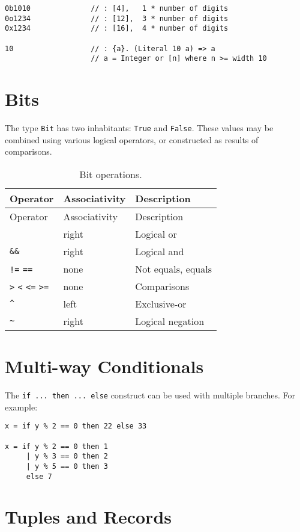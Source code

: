 \begin{verbatim}
0b1010              // : [4],   1 * number of digits
0o1234              // : [12],  3 * number of digits
0x1234              // : [16],  4 * number of digits

10                  // : {a}. (Literal 10 a) => a
                    // a = Integer or [n] where n >= width 10
\end{verbatim}

\section{Bits}\label{bits}

The type \texttt{Bit} has two inhabitants: \texttt{True} and
\texttt{False}. These values may be combined using various logical
operators, or constructed as results of comparisons.

\begin{longtable}[c]{@{}lll@{}}
\caption{Bit operations.}\tabularnewline
\toprule
Operator & Associativity & Description\tabularnewline
\midrule
\endfirsthead
\toprule
Operator & Associativity & Description\tabularnewline
\midrule
\endhead
\texttt{\textbar{}\textbar{}} & right & Logical or\tabularnewline
\texttt{\&\&} & right & Logical and\tabularnewline
\texttt{!=} \texttt{==} & none & Not equals, equals\tabularnewline
\texttt{\textgreater{}} \texttt{\textless{}} \texttt{\textless{}=}
\texttt{\textgreater{}=} & none & Comparisons\tabularnewline
\texttt{\^{}} & left & Exclusive-or\tabularnewline
\texttt{\textasciitilde{}} & right & Logical negation\tabularnewline
\bottomrule
\end{longtable}

\section{Multi-way Conditionals}\label{multiway-conditionals}

The \texttt{if\ ...\ then\ ...\ else} construct can be used with
multiple branches. For example:

\begin{verbatim}
x = if y % 2 == 0 then 22 else 33

x = if y % 2 == 0 then 1
     | y % 3 == 0 then 2
     | y % 5 == 0 then 3
     else 7
\end{verbatim}

\section{Tuples and Records}\label{tuples-and-records}

